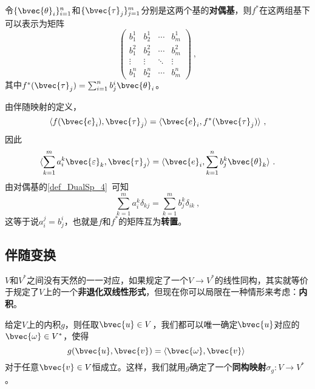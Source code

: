 令$\{\bvec{\theta}_i\}_{i=1}^n$和$\{\bvec{\tau}_j\}_{j=1}^m$分别是这两个基的\textbf{对偶基}，则$f^*$在这两组基下可以表示为矩阵
\begin{equation}
\begin{pmatrix}
b^1_1&b^1_2&\cdots&b^1_m\\
b^2_1&b^2_2&\cdots&b^2_m\\
\vdots&\vdots&\ddots&\vdots\\
b^n_1&b^n_2&\cdots&b^n_m
\end{pmatrix}~, 
\end{equation}
其中$f^*(\bvec{\tau}_j)=\sum_{i=1}^n b^i_j\bvec{\theta}_i$。

由伴随映射的定义，
\begin{equation}
\langle f(\bvec{e}_i), \bvec{\tau}_j \rangle =\langle \bvec{e}_i, f^*(\bvec{\tau}_j) \rangle ~, 
\end{equation}
因此
\begin{equation}
\langle \sum_{k=1}^m a^k_i\bvec{\varepsilon}_k, \bvec{\tau}_j \rangle =\langle \bvec{e}_i, \sum_{k=1}^n b^k_j\bvec{\theta}_k \rangle ~. 
\end{equation}
由对偶基的\autoref{def_DualSp_4}~可知
\begin{equation}
\sum_{k=1}^m a^k_i\delta_{kj} = \sum_{k=1}^m b^k_j\delta_{ik}~, 
\end{equation}
这等于说$a^j_i=b^i_j$，也就是$f$和$f^*$的矩阵互为\textbf{转置}。






\subsection{伴随变换}



$V$和$V^*$之间没有天然的一一对应，如果规定了一个$V\to V^*$的线性同构，其实就等价于规定了$V$上的一个\textbf{非退化双线性形式}，但现在你可以局限在一种情形来考虑：\textbf{内积}。

给定$V$上的内积$g$，则任取$\bvec{u}\in V$，我们都可以唯一确定$\bvec{u}$对应的$\bvec{\omega}\in V^*$，使得
\begin{equation}
g(\bvec{u}, \bvec{v}) = \langle \bvec{\omega}, \bvec{v} \rangle~
\end{equation}
对于任意$\bvec{v}\in V$恒成立。这样，我们就用$g$确定了一个\textbf{同构映射}$\sigma_g:V\to V^*$。





